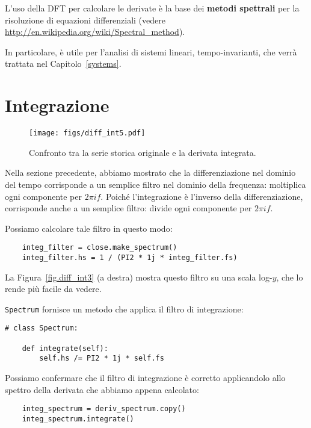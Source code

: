 \documentclass[12pt]{book} \usepackage[width=5.5in,height=8.5in, hmarginratio=3:2,vmarginratio=1:1]{geometry}
\begin{document}
L'uso della DFT per calcolare le derivate è la base dei {\bf metodi spettrali} per la risoluzione di equazioni differenziali (vedere \url{http://en.wikipedia.org/wiki/Spectral_method}).

In particolare, è utile per l'analisi di sistemi lineari, tempo-invarianti, che verrà trattata nel Capitolo~\ref{systems}.

\section{Integrazione} 

\begin{figure} 

\centerline{\texttt{[image: figs/diff\_int5.pdf]}} \caption{Confronto tra la serie storica originale e la derivata integrata.} \label{fig.diff_int5} \end{figure} 

Nella sezione precedente, abbiamo mostrato che la differenziazione nel dominio del tempo corrisponde a un semplice filtro nel dominio della frequenza: moltiplica ogni componente per $2 \pi i f$. Poiché l'integrazione è l'inverso della differenziazione, corrisponde anche a un semplice filtro: divide ogni componente per $2 \pi i f$.

Possiamo calcolare tale filtro in questo modo:

\begin{verbatim} 
    integ_filter = close.make_spectrum()
    integ_filter.hs = 1 / (PI2 * 1j * integ_filter.fs)
 \end{verbatim} 

La Figura~\ref{fig.diff_int3} (a destra) mostra questo filtro su una scala log-$y$, che lo rende più facile da vedere.

{\tt Spectrum} fornisce un metodo che applica il filtro di integrazione:

\begin{verbatim} 
# class Spectrum:

    def integrate(self):
        self.hs /= PI2 * 1j * self.fs
 \end{verbatim} 

Possiamo confermare che il filtro di integrazione è corretto applicandolo allo spettro della derivata che abbiamo appena calcolato:

\begin{verbatim} 
    integ_spectrum = deriv_spectrum.copy()
    integ_spectrum.integrate()
 \end{verbatim} 
\end{document}
